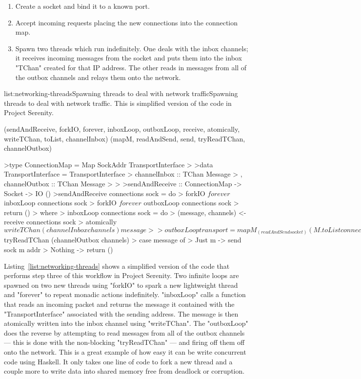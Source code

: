 \begin{enumerate}
\item Create a socket and bind it to a known port.
\item Accept incoming requests placing the new connections into the connection map.
\item Spawn two threads which run indefinitely. One deals with the inbox channels; it receives
      incoming messages from the socket and puts them into the inbox "TChan" created for that
      IP address. The other reads in messages from all of the outbox channels and relays them
      onto the network.
\end{enumerate}

\vspace{-0.5em}
\begin{listing}{list:networking-threads}{Spawning threads to deal with network traffic}{Spawning threads to deal with network traffic. This is simplified version of the code in Project Serenity.}{}
\end{listing}\vspace{-1.5em}

\functions(sendAndReceive, forkIO, forever, inboxLoop, outboxLoop, receive, atomically, writeTChan, toList, channelInbox)
\functions(mapM, readAndSend, send, tryReadTChan, channelOutbox)
\begin{haskell}
>type ConnectionMap = Map SockAddr TransportInterface
>
>data TransportInterface = TransportInterface
>  { channelInbox :: TChan Message
>  , channelOutbox :: TChan Message
>  }
>
>sendAndReceive :: ConnectionMap -> Socket -> IO ()
>sendAndReceive connections sock = do
>  forkIO $ forever $ inboxLoop connections sock
>  forkIO $ forever $ outboxLoop connections sock
>  return ()
>  where
>    inboxLoop connections sock = do
>      (message, channels) <- receive connections sock
>      atomically $ writeTChan (channelInbox channels) message
>
>    outboxLoop transport = mapM_ (readAndSend socket) (M.toList connections)
>
>    readAndSend sock (addr, channels) = do
>      message <- atomically $ tryReadTChan (channelOutbox channels)
>      case message of
>        Just m -> send sock m addr
>        Nothing -> return ()

\end{haskell}
\noindent
Listing~\ref{list:networking-threads} shows a simplified version of the code that performs
step three of this workflow in Project Serenity. Two infinite loops are spawned on two new
threads using "forkIO" to spark a new lightweight thread and "forever" to repeat monadic
actions indefinitely. "inboxLoop" calls a function that reads an incoming packet and returns
the message it contained with the "TransportInterface" associated with the sending address.
The message is then atomically written into the inbox channel using "writeTChan". The "outboxLoop"
does the reverse by attempting to read messages from all of the outbox channels --- this is
done with the non-blocking "tryReadTChan" --- and firing off them off onto the network.
This is a great example of how easy it can be write concurrent code using Haskell. It only
takes one line of code to fork a new thread and a couple more to write data into shared
memory free from deadlock or corruption.
